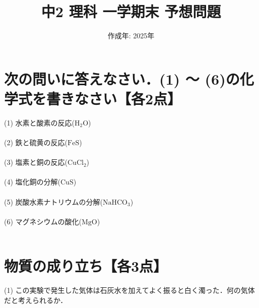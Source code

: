 \documentclass[autodetect-engine,dvi=dvipdfmx,ja=standard,
               a4j,11pt]{bxjsarticle}
\title{中2 理科 一学期末 予想問題}
\author{}
\date{作成年: 2025年\\}  %
\begin{document}
\maketitle
\section{\textbf{次の問いに答えなさい．(1) ～ (6)の化学式を書きなさい}【各2点】}
    (1) 水素と酸素の反応($\mathrm{H_2O}$)\\\\

    (2) 鉄と硫黄の反応($\mathrm{FeS}$)\\\\

    (3) 塩素と銅の反応($\mathrm{CuCl_2}$)\\\\

    (4) 塩化銅の分解($\mathrm{CuS} $)\\\\

    (5) 炭酸水素ナトリウムの分解($\mathrm{NaHCO_3}$)\\\\

    (6) マグネシウムの酸化($\mathrm{MgO} $)\\\\
    \clearpage
\section{物質の成り立ち【各3点】}
\begin{figure}[htb]
        \centering
        \vspace{20pt} %
        \caption{}
\end{figure}
    (1) この実験で発生した気体は石灰水を加えてよく振ると白く濁った．何の気体だと考えられるか．\\\\
\end{document}
